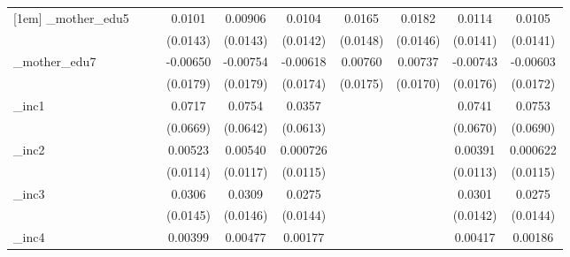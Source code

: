 \begin{table}[htbp]
\begin{tabular}{l*{9}{c}}
[1em]
\_mother\_edu5&                     &                     &      0.0101         &     0.00906         &      0.0104         &      0.0165         &      0.0182         &      0.0114         &      0.0105         \\
            &                     &                     &    (0.0143)         &    (0.0143)         &    (0.0142)         &    (0.0148)         &    (0.0146)         &    (0.0141)         &    (0.0141)         \\
[1em]
\_mother\_edu7&                     &                     &    -0.00650         &    -0.00754         &    -0.00618         &     0.00760         &     0.00737         &    -0.00743         &    -0.00603         \\
            &                     &                     &    (0.0179)         &    (0.0179)         &    (0.0174)         &    (0.0175)         &    (0.0170)         &    (0.0176)         &    (0.0172)         \\
[1em]
\_inc1       &                     &                     &      0.0717         &      0.0754         &      0.0357         &                     &                     &      0.0741         &      0.0753         \\
            &                     &                     &    (0.0669)         &    (0.0642)         &    (0.0613)         &                     &                     &    (0.0670)         &    (0.0690)         \\
[1em]
\_inc2       &                     &                     &     0.00523         &     0.00540         &    0.000726         &                     &                     &     0.00391         &    0.000622         \\
            &                     &                     &    (0.0114)         &    (0.0117)         &    (0.0115)         &                     &                     &    (0.0113)         &    (0.0115)         \\
[1em]
\_inc3       &                     &                     &      0.0306\sym{**} &      0.0309\sym{**} &      0.0275\sym{*}  &                     &                     &      0.0301\sym{**} &      0.0275\sym{*}  \\
            &                     &                     &    (0.0145)         &    (0.0146)         &    (0.0144)         &                     &                     &    (0.0142)         &    (0.0144)         \\
[1em]
\_inc4       &                     &                     &     0.00399         &     0.00477         &     0.00177         &                     &                     &     0.00417         &     0.00186         \\

\end{tabular}
\end{table}
